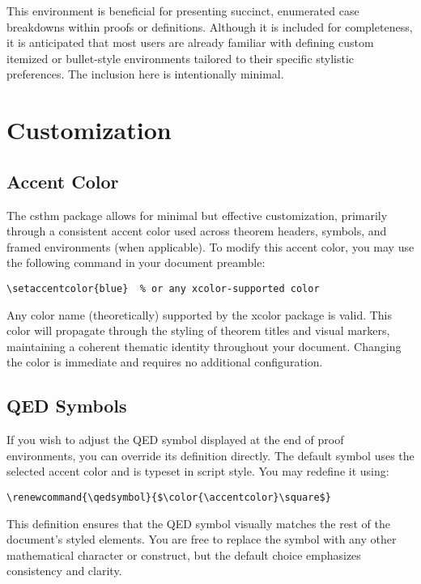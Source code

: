 \documentclass[10pt,letterpaper]{amsart}
\begin{document}
This environment is beneficial for presenting succinct, enumerated case
breakdowns within proofs or definitions. Although it is included for
completeness, it is anticipated that most users are already familiar with
defining custom itemized or bullet-style environments tailored to their
specific stylistic preferences. The inclusion here is intentionally minimal.

\section{Customization}

\subsection{Accent Color}

The \textsf{csthm} package allows for minimal but effective customization,
primarily through a consistent accent color used across theorem headers,
symbols, and framed environments (when applicable). To modify this accent
color, you may use the following command in your document preamble:

\begin{verbatim}
\setaccentcolor{blue}  % or any xcolor-supported color
\end{verbatim}

Any color name (theoretically) supported by the \textsf{xcolor} package is
valid. This color will propagate through the styling of theorem titles and
visual markers, maintaining a coherent thematic identity throughout your
document. Changing the color is immediate and requires no additional
configuration.

\subsection{QED Symbols}

If you wish to adjust the QED symbol displayed at the end of proof
environments, you can override its definition directly. The default symbol uses
the selected accent color and is typeset in script style. You may redefine it
using:

\begin{verbatim}
\renewcommand{\qedsymbol}{$\color{\accentcolor}\square$}
\end{verbatim}

This definition ensures that the QED symbol visually matches the rest of the
document's styled elements. You are free to replace the symbol with any other
mathematical character or construct, but the default choice emphasizes
consistency and clarity.
\end{document}
